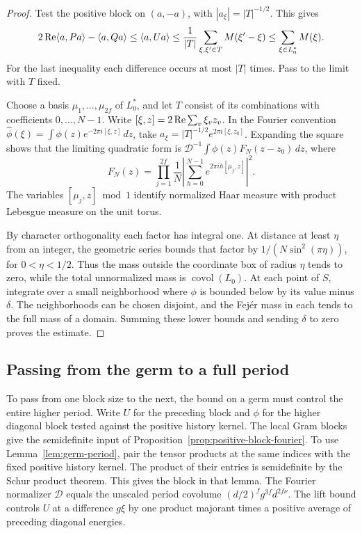 \begin{proof}
Test the positive block on \((a,-a)\), with
\(|a_\xi|=|T|^{-1/2}\). This gives
\[
 2\operatorname{Re}\langle a,Pa\rangle-\langle a,Qa\rangle
 \le \langle a,Ua\rangle
 \le \frac1{|T|}\sum_{\xi,\xi'\in T}M(\xi'-\xi)
 \le \sum_{\xi\in L_0^*}M(\xi).
\]
For the last inequality each difference occurs at most \(|T|\)
times. Pass to the limit
with \(T\) fixed.

Choose a basis \(\mu_1,\ldots,\mu_{2f}\) of \(L_0^*\), and let \(T\) consist of its combinations with coefficients \(0,\ldots,N-1\). Write \([\xi,z]=2\operatorname{Re}\sum_v\xi_vz_v\). In the Fourier convention \(\widehat\phi(\xi)=\int\phi(z)e^{-2\pi i[\xi,z]}\,dz\), take \(a_\xi=|T|^{-1/2}e^{2\pi i[\xi,z_0]}\). Expanding the square shows that the limiting quadratic form is \(\mathcal D^{-1}\int\phi(z)F_N(z-z_0)\,dz\), where
\[
 F_N(z)=\prod_{j=1}^{2f}\frac1N
       \left|\sum_{h=0}^{N-1}e^{2\pi i h[\mu_j,z]}\right|^2 .
\]
The variables \([\mu_j,z]\bmod 1\) identify normalized Haar measure with product Lebesgue measure on the unit torus.

By character orthogonality each factor has integral one. At distance at least \(\eta\) from an integer, the geometric series bounds that factor by \(1/(N\sin^2(\pi\eta))\), for \(0<\eta<1/2\). Thus the mass outside the coordinate box of radius \(\eta\) tends to zero, while the total unnormalized mass is \(\operatorname{covol}(L_0)\).
At each point of \(S\), integrate over a small neighborhood
where \(\phi\) is bounded below by its value minus \(\delta\).
The neighborhoods can be chosen disjoint, and the Fej\'er
mass in each tends to the full mass of a domain. Summing
these lower bounds and sending \(\delta\) to zero proves
the estimate.
\end{proof}

\subsection{Passing from the germ to a full period}

To pass from one block size to the next, the bound on a germ must control the entire higher period. Write \(U\) for the preceding block and \(\phi\) for the higher diagonal block tested against the positive history kernel. The local Gram blocks give the semidefinite input of
Proposition~\ref{prop:positive-block-fourier}. To use
Lemma~\ref{lem:germ-period}, pair the tensor products at the
same indices with the fixed positive history kernel. The
product of their entries is semidefinite by the Schur product
theorem. This gives the block in that lemma. The Fourier normalizer
\(\mathcal D\) equals the unscaled period covolume
\((d/2)^f g^{3f}d^{2f\nu}\). The lift bound controls \(U\)
at a difference \(g\xi\) by one product majorant times a
positive average of preceding diagonal energies.

